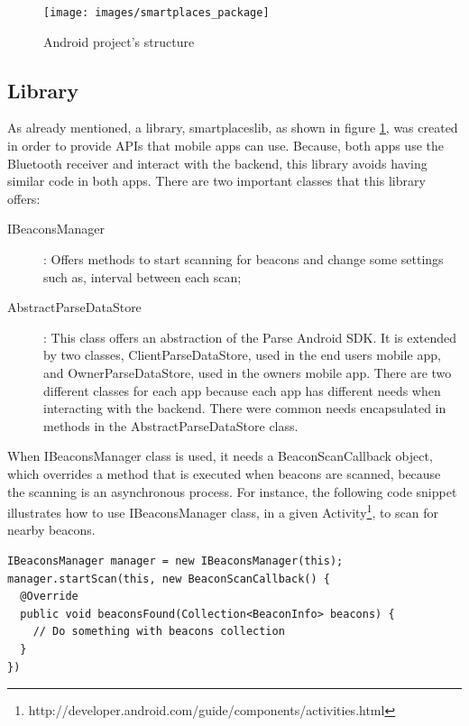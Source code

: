 \begin{figure}[!ht]
  \centering
    \texttt{[image: images/smartplaces\_package]}
    \caption{Android project's structure}
    \label{fig:smartplaces_package}
\end{figure}

\subsection{Library}
\label{sub:library}
As already mentioned, a library, smartplaceslib, as shown in figure \ref{fig:smartplaces_package}, was created in order to provide \glspl{API} that mobile apps can
use. Because, both apps use the Bluetooth receiver and interact with the backend, this library avoids having similar code in both apps. There are two important classes that this library offers:
\begin{description}
  \item[IBeaconsManager]: Offers methods to start scanning for beacons and change some settings such as, interval between each scan;
  \item[AbstractParseDataStore]: This class offers an abstraction of the Parse Android \gls{SDK}. It is extended by two classes, ClientParseDataStore, used in the end users mobile app, and OwnerParseDataStore, used in the owners mobile app. There are two different classes for each app because each app has different needs when interacting with the backend. There were common needs encapsulated in methods in the AbstractParseDataStore class.
\end{description}

When IBeaconsManager class is used, it needs a BeaconScanCallback object, which overrides a method that is executed when beacons are scanned, because the scanning is an asynchronous process.
For instance, the following code snippet illustrates how to use IBeaconsManager class, in a given
Activity\footnote{http://developer.android.com/guide/components/activities.html}, to scan for nearby beacons.

\begin{lstlisting}
IBeaconsManager manager = new IBeaconsManager(this);
manager.startScan(this, new BeaconScanCallback() {
  @Override
  public void beaconsFound(Collection<BeaconInfo> beacons) {
    // Do something with beacons collection
  }
})
\end{lstlisting}

